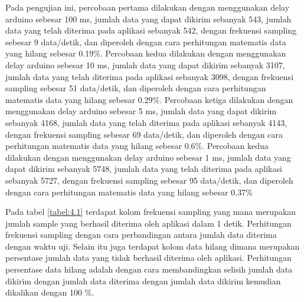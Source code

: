 Pada pengujian ini, percobaan pertama dilakukan dengan menggunakan delay arduino sebesar 100 ms, jumlah data yang dapat dikirim sebanyak 543, jumlah data yang telah diterima pada aplikasi sebanyak 542, dengan frekuensi sampling sebesar 9 data/detik, dan diperoleh dengan cara perhitungan matematis data yang hilang sebesar 0.19\%. Percobaan kedua dilakukan dengan menggunakan delay arduino sebesar 10 ms, jumlah data yang dapat dikirim sebanyak 3107, jumlah data yang telah diterima pada aplikasi sebanyak 3098, dengan frekuensi sampling sebesar 51 data/detik, dan diperoleh dengan cara perhitungan matematis data yang hilang sebesar 0.29\%. Percobaan ketiga dilakukan dengan menggunakan delay arduino sebesar 5 ms, jumlah data yang dapat dikirim sebanyak 4168, jumlah data yang telah diterima pada aplikasi sebanyak 4143, dengan frekuensi sampling sebesar 69 data/detik, dan diperoleh dengan cara perhitungan matematis data yang hilang sebesar 0.6\%. Percobaan kedua dilakukan dengan menggunakan delay arduino sebesar 1 ms, jumlah data yang dapat dikirim sebanyak 5748, jumlah data yang telah diterima pada aplikasi sebanyak 5727, dengan frekuensi sampling sebesar 95 data/detik, dan diperoleh dengan cara perhitungan matematis data yang hilang sebesar 0.37\%

Pada tabel \ref{tabel:4.1} terdapat kolom frekuensi sampling yang mana merupakan jumlah sample yang berhasil diterima oleh aplikasi dalam 1 detik. Perhitungan frekuensi sampling dengan cara perbandingan antara jumlah data diterima dengan waktu uji. Selain itu juga terdapat kolom data hilang dimana merupakan persentase jumlah data yang tidak berhasil
diterima oleh aplikasi. Perhitungan persentase data hilang adalah dengan cara membandingkan selisih jumlah data dikirim dengan jumlah data diterima dengan jumlah data dikirim kemudian dikalikan dengan 100 \%.

\vspace{1ex}


